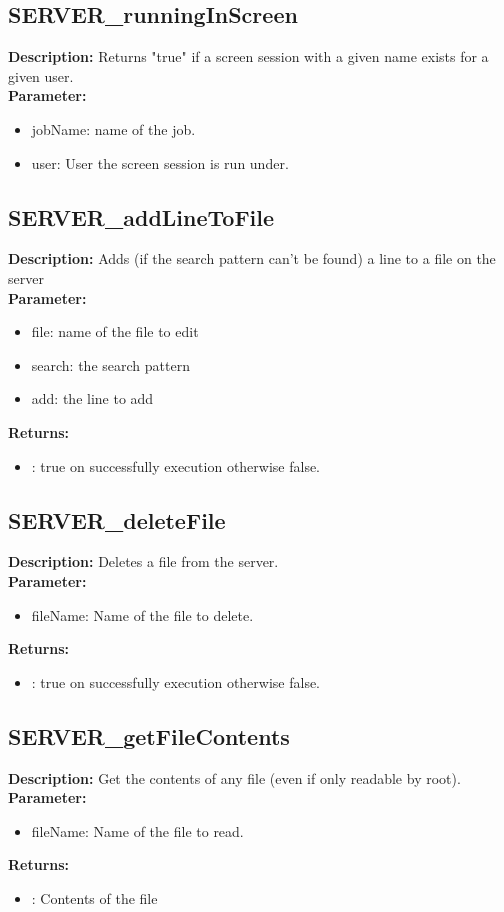 \subsection{SERVER\_runningInScreen}
\textbf{Description:} Returns "true" if a screen session with a given name exists for a given user.\\
\textbf{Parameter:}
\begin{itemize}
\item jobName: name of the job.
\item user: User the screen session is run under.
\end{itemize}

\subsection{SERVER\_addLineToFile}
\textbf{Description:} Adds (if the search pattern can't be found) a line to a file on the server\\
\textbf{Parameter:}
\begin{itemize}
\item file: name of the file to edit
\item search: the search pattern
\item add: the line to add
\end{itemize}
\textbf{Returns:}
\begin{itemize}
\item : true on successfully execution otherwise false.
\end{itemize}

\subsection{SERVER\_deleteFile}
\textbf{Description:} Deletes a file from the server.\\
\textbf{Parameter:}
\begin{itemize}
\item fileName: Name of the file to delete.
\end{itemize}
\textbf{Returns:}
\begin{itemize}
\item : true on successfully execution otherwise false.
\end{itemize}

\subsection{SERVER\_getFileContents}
\textbf{Description:} Get the contents of any file (even if only readable by root).\\
\textbf{Parameter:}
\begin{itemize}
\item fileName: Name of the file to read.
\end{itemize}
\textbf{Returns:}
\begin{itemize}
\item : Contents of the file
\end{itemize}

